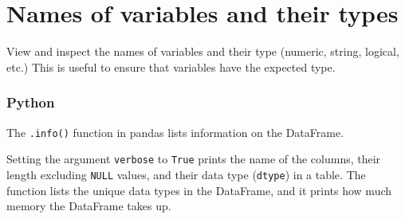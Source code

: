 \documentclass[
]{book}
\begin{document}
\hypertarget{names-of-variables-and-their-types}{%
\section{Names of variables and their types}\label{names-of-variables-and-their-types}}

View and inspect the names of variables and their type (numeric, string, logical, etc.) This is useful to ensure that variables have the expected type.

\hypertarget{python-17}{%
\subsubsection*{Python}\label{python-17}}

The \texttt{.info()} function in pandas lists information on the DataFrame.

Setting the argument \texttt{verbose} to \texttt{True} prints the name of the columns, their length excluding \texttt{NULL} values, and their data type (\texttt{dtype}) in a table. The function lists the unique data types in the DataFrame, and it prints how much memory the DataFrame takes up.
\end{document}
